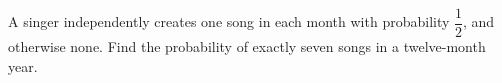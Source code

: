 A singer independently creates one song in each month with probability $\dfrac{1}{2}$, and otherwise none. Find the probability of exactly seven songs in a twelve-month year.
